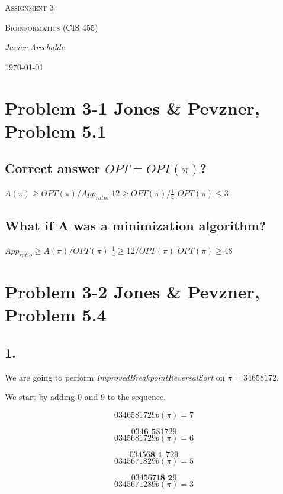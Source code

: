 \documentclass{article}
\begin{document}
\begin{titlepage}
	\centering
	{\scshape\LARGE Assignment 3\par}
	\vspace{1cm}
	{\scshape\Large Bioinformatics (CIS 455)\par}
	\vspace{1.5cm}
	{\Large\itshape Javier Arechalde\par}
	\vfill
	{\large \today\par}
\end{titlepage}

\section*{Problem 3-1 Jones \& Pevzner, Problem 5.1}

\subsection*{Correct answer $OPT = OPT(\pi)$?}

$A(\pi) \geq OPT(\pi)/App_{ratio}$
$12 \geq OPT(\pi)/\frac{1}{4}$
$OPT(\pi) \leq 3$

\subsection*{What if A was a minimization algorithm?}

$App_{ratio} \geq A(\pi)/OPT(\pi)$
$\frac{1}{4} \geq 12/OPT(\pi)$
$OPT(\pi) \geq 48$

\section*{Problem 3-2 Jones \& Pevzner, Problem 5.4}

\subsection*{1.}

We are going to perform \textit{ImprovedBreakpointReversalSort} on $\pi = 3 4 6 5 8 1 7 2$.

We start by adding 0 and 9 to the sequence.

$$0 3 4 6 5 8 1 7 2 9 b(\pi) = 7$$

$$0 3 4 \textbf{6 5} 8 1 7 2 9$$
$$0 3 4 5 6 8 1 7 2 9 b(\pi) = 6$$

$$0 3 4 5 6 \textbf{8 1 7} 2 9$$
$$0 3 4 5 6 7 1 8 2 9 b(\pi) = 5$$

$$0 3 4 5 6 7 1 \textbf{8 2} 9$$
$$0 3 4 5 6 7 1 2 8 9 b(\pi) = 3$$
\end{document}
